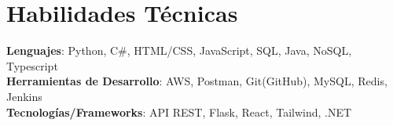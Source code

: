 \documentclass[letterpaper,11pt]{article}
\begin{document}
\section{Habilidades Técnicas}
 \begin{itemize}[leftmargin=0.15in, label={}]
    \small{\item{
     \textbf{Lenguajes}{: Python, C\#, HTML/CSS, JavaScript, SQL, Java, NoSQL, Typescript} \\
     \textbf{Herramientas de Desarrollo}{: AWS, Postman, Git(GitHub), MySQL, Redis, Jenkins} \\
     \textbf{Tecnologías/Frameworks}{: API REST, Flask, React, Tailwind, .NET} \\
    }}
 \end{itemize}
 \vspace{-16pt}


\end{document}
